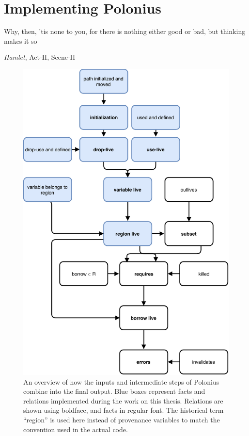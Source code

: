 \documentclass[11pt,a4paper,twoside,openany]{report}
\renewcommand\_{\textunderscore\allowbreak}
\begin{document}
\chapter{Implementing Polonius}\label{cha:implementation}

\epigraph{Why, then, 'tis none to you, for there is nothing either good or bad,
  but thinking makes it so}%
{\textit{Hamlet}, Act-II, Scene-II}

\begin{figure}
  \includegraphics[width=0.9\linewidth]{Graphs/polonius-overview}
  \caption[Flowchart of the Polonius Inputs and Outputs]{An overview of how the
    inputs and intermediate steps of Polonius combine into the final output.
    Blue boxes represent facts and relations implemented during the work on this
    thesis. Relations are shown using boldface, and facts in regular font. The
    historical term ``region'' is used here instead of provenance variables to
    match the convention used in the actual code.}\label{fig:polonius-overview}
\end{figure}
\end{document}
